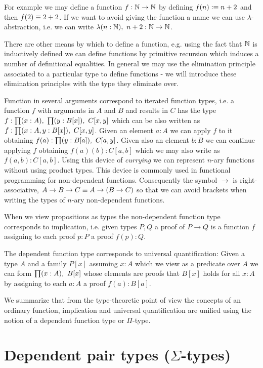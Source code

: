 For example we may define a function $f : \mathbb{N} \to \mathbb{N}$ by defining $f(n)
\vcentcolon\equiv n+2$ and then $f(2) \equiv 2+2$. If we want to avoid giving the function a name we can use
$\lambda$-abstraction, i.e. we can write $\lam{n:\Nat}n+2 : \Nat
\to \Nat$. 

There are other means by which to define a function,
e.g. using the fact that $\mathbb{N}$ is inductively defined we can define
functions by primitive recursion which induces a number of
definitional equalities. In general we may use the
elimination principle associated to a particular type to define
functions - we will introduce these elimination principles with the
type they eliminate over.

Function in several arguments correspond to iterated function types,
i.e. a function $f$ with arguments in $A$ and $B$ and results in $C$ has
the type $f : \prd{x:A}\prd{y : B[x]}C[x,y]$ which can be also
written as $f : \prd{x:A,y:B[x]}C[x,y]$. Given an element $a:A$ we can apply
$f$ to it obtaining $f(a) : \prd{y:B[a]}C[a,y]$. Given also an element $b:B$ we
can continue applying $f$ obtaining $f(a)(b) : C[a,b]$ which we may also
write as $f(a,b):C[a,b]$. Using this device of \emph{currying} we can
represent $n$-ary functions without using product types. 
This device is commonly used in functional programming for
non-dependent functions. Consequently the symbol $\to$ is
right-associative,  $A \to B \to C \equiv A \to (B \to C)$ so that we can avoid
brackets when writing the types of $n$-ary non-dependent functions.

When we view propositions as types the non-dependent function type
corresponds to implication, i.e. given types $P,Q$ a proof of $P \to
Q$ is a function $f$ assigning to each proof $p:P$ a proof $f(p) : Q$.

The dependent function type corresponds to universal
quantification: Given a type $A$ and a family $P[x]$ assuming $x:A$
which we view as a predicate over $A$ we can form $\prd{x:A}B[x]$
whose elements are proofs that $B[x]$ holds for all $x:A$ by assigning
to each $a:A$ a proof $f(a) : B[a]$.

We summarize that from the type-theoretic point of view the concepts
of an ordinary function, implication and universal quantification are
unified using the notion of a dependent function type or $\Pi$-type.

\section{Dependent pair types (\texorpdfstring{$\Sigma$}{Σ}-types)}
\label{sec:sigma-types}

